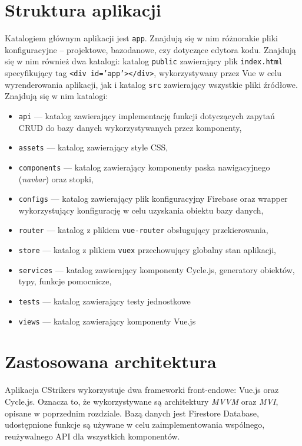 \documentclass[shortabstract]{iithesis}
\theoremstyle{definition} \newtheorem{definition}{Definicja}[]
\theoremstyle{remark} \newtheorem{remark}[definition]{Observation}
\theoremstyle{plain} \newtheorem{theorem}[definition]{Theorem}
\theoremstyle{plain} \newtheorem{lemma}[definition]{Lemma}
\begin{document}
\section{Struktura aplikacji}
Katalogiem głównym aplikacji jest \texttt{app}. Znajdują się w nim różnorakie pliki konfiguracyjne -- projektowe, bazodanowe, czy dotyczące edytora kodu. Znajdują się w nim również dwa katalogi: katalog \texttt{public} zawierający plik \texttt{index.html} specyfikujący tag \texttt{<div id='app'></div>}, wykorzystywany przez Vue w celu wyrenderowania aplikacji, jak i katalog \texttt{src} zawierający wszystkie pliki źródłowe. Znajdują się w nim katalogi:
\begin{itemize}
    \item \texttt{api} --- katalog zawierający implementację funkcji dotyczących zapytań CRUD do bazy danych wykorzystywanych przez komponenty,
    \item \texttt{assets} --- katalog zawierający style CSS,
    \item \texttt{components} --- katalog zawierający komponenty paska nawigacyjnego (\textit{navbar}) oraz stopki,
    \item \texttt{configs} --- katalog zawierający plik konfiguracyjny Firebase oraz wrapper wykorzystujący konfigurację w celu uzyskania obiektu bazy danych,
    \item \texttt{router} --- katalog z plikiem \texttt{vue-router} obsługujący przekierowania,
    \item \texttt{store} --- katalog z plikiem \texttt{vuex} przechowujący globalny stan aplikacji,
    \item \texttt{services} --- katalog zawierający komponenty Cycle.js, generatory obiektów, typy, funkcje pomocnicze,
    \item \texttt{tests} --- katalog zawierający testy jednostkowe
    \item \texttt{views} --- katalog zawierający komponenty Vue.js
\end{itemize}

\section{Zastosowana architektura}
Aplikacja CStrikers wykorzystuje dwa frameworki front-endowe: Vue.js oraz Cycle.js. Oznacza to, że wykorzystywane są architektury \textit{MVVM} oraz \textit{MVI}, opisane w poprzednim rozdziale. Bazą danych jest Firestore Database, udostępnione funkcje są używane w celu zaimplementowania wspólnego, reużywalnego API dla wszystkich komponentów.
\end{document}
